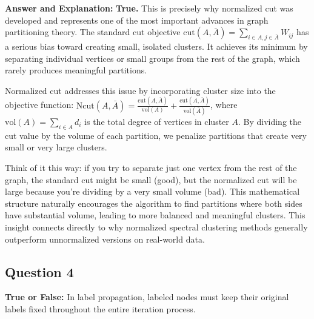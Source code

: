 \documentclass[11pt]{article}
\newenvironment{answer}{\color{answercolor}\begin{framed}\textbf{Answer and Explanation:}}{\end{framed}}
\begin{document}
\begin{answer}
\textbf{True.} This is precisely why normalized cut was developed and represents one of the most important advances in graph partitioning theory. The standard cut objective $\text{cut}(A, \bar{A}) = \sum_{i \in A, j \in \bar{A}} W_{ij}$ has a serious bias toward creating small, isolated clusters. It achieves its minimum by separating individual vertices or small groups from the rest of the graph, which rarely produces meaningful partitions.

Normalized cut addresses this issue by incorporating cluster size into the objective function: $\text{Ncut}(A, \bar{A}) = \frac{\text{cut}(A, \bar{A})}{\text{vol}(A)} + \frac{\text{cut}(A, \bar{A})}{\text{vol}(\bar{A})}$, where $\text{vol}(A) = \sum_{i \in A} d_i$ is the total degree of vertices in cluster $A$. By dividing the cut value by the volume of each partition, we penalize partitions that create very small or very large clusters.

Think of it this way: if you try to separate just one vertex from the rest of the graph, the standard cut might be small (good), but the normalized cut will be large because you're dividing by a very small volume (bad). This mathematical structure naturally encourages the algorithm to find partitions where both sides have substantial volume, leading to more balanced and meaningful clusters. This insight connects directly to why normalized spectral clustering methods generally outperform unnormalized versions on real-world data.
\end{answer}

\subsection{Question 4}
\textbf{True or False:} In label propagation, labeled nodes must keep their original labels fixed throughout the entire iteration process.
\end{document}
